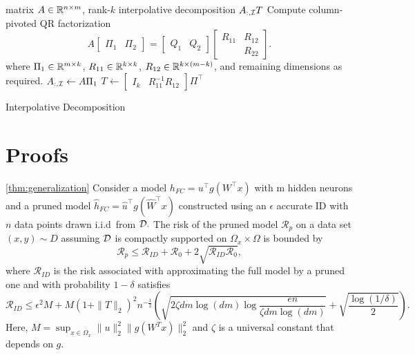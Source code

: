 \begin{algorithm}[ht]%
\begin{algorithmic}
\label{alg:genericID}
\REQUIRE
matrix $A \in \mathbb{R}^{n \times m}$, rank-$k$
\ENSURE
interpolative decomposition $A_{:,\mathcal{I}} T$
\STATE Compute column-pivoted QR factorization 
\[
    A
    \begin{bmatrix}
    \Pi_1 & \Pi_2
    \end{bmatrix}
    =
    \begin{bmatrix}
    Q_1 & Q_2
    \end{bmatrix}
    \begin{bmatrix}
    R_{11} & R_{12} \\
    & R_{22}
    \end{bmatrix}.
\]
where
$\Pi_1 \in \mathbb{R}^{m \times k}$, 
$R_{11} \in \mathbb{R}^{k \times k}$, 
$R_{12} \in \mathbb{R}^{k \times (m-k)}$, 
and remaining dimensions as required.
\;
\STATE $A_{:,\mathcal{I}} \gets A \Pi_1$ \;
\STATE $T \gets 
\begin{bmatrix}
I_k & R_{11}^{-1} R_{12}
\end{bmatrix}
\Pi^\top$\;
\end{algorithmic}
\caption{Interpolative Decomposition}
\end{algorithm}

\section{Proofs}

\begin{customthm}{\ref{thm:generalization}}
Consider a model $h_{FC}=u^\top g(W^\top x)$ with m hidden neurons and a pruned model $\widehat{h}_{FC}=\widehat{u}^\top g(\widehat{W}^\top x)$ constructed using an $\epsilon$ accurate ID with $n$ data points drawn i.i.d\ from $\mathcal{D}.$ The risk of the pruned model $\mathcal{R}_p$ on a data set $(x,y) \sim D$ assuming $\mathcal{D}$ is compactly supported on $\Omega_x\times\Omega$ is bounded by  
\begin{equation*}
    \mathcal{R}_p \leq \mathcal{R}_{ID} + \mathcal{R}_0+ 2  \sqrt{ \mathcal{R}_{ID}  \mathcal{R}_0},
\end{equation*}
where $\mathcal{R}_{ID}$ is the risk associated with approximating the full model by a pruned one and with probability $1-\delta$ satisfies
\begin{equation*}
    {\mathcal{R}}_{ID} \leq \epsilon^2M+M(1+\|T\|_2)^2n^{-\frac{1}{2}} \left( \sqrt{2\zeta dm \log (dm)\log\frac{en}{\zeta dm \log (dm)}}+ \sqrt{\frac{\log (1/\delta)}{2}}\right).
\end{equation*} 
Here, $M = \sup_{x\in\Omega_x} \|u\|_2^2 \| g(W^T x)\|_2^2$ and $\zeta$ is a universal constant that depends on $g$. %


\end{customthm}


